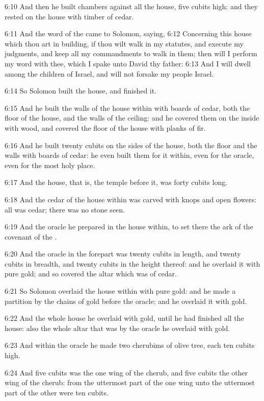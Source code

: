 6:10 And then he built chambers against all the house, five cubits
high: and they rested on the house with timber of cedar.

6:11 And the word of the \LORD came to Solomon, saying, 6:12 Concerning
this house which thou art in building, if thou wilt walk in my
statutes, and execute my judgments, and keep all my commandments to
walk in them; then will I perform my word with thee, which I spake
unto David thy father: 6:13 And I will dwell among the children of
Israel, and will not forsake my people Israel.

6:14 So Solomon built the house, and finished it.

6:15 And he built the walls of the house within with boards of cedar,
both the floor of the house, and the walls of the ceiling: and he
covered them on the inside with wood, and covered the floor of the
house with planks of fir.

6:16 And he built twenty cubits on the sides of the house, both the
floor and the walls with boards of cedar: he even built them for it
within, even for the oracle, even for the most holy place.

6:17 And the house, that is, the temple before it, was forty cubits
long.

6:18 And the cedar of the house within was carved with knops and open
flowers: all was cedar; there was no stone seen.

6:19 And the oracle he prepared in the house within, to set there the
ark of the covenant of the \LORD.

6:20 And the oracle in the forepart was twenty cubits in length, and
twenty cubits in breadth, and twenty cubits in the height thereof: and
he overlaid it with pure gold; and so covered the altar which was of
cedar.

6:21 So Solomon overlaid the house within with pure gold: and he made
a partition by the chains of gold before the oracle; and he overlaid
it with gold.

6:22 And the whole house he overlaid with gold, until he had finished
all the house: also the whole altar that was by the oracle he overlaid
with gold.

6:23 And within the oracle he made two cherubims of olive tree, each
ten cubits high.

6:24 And five cubits was the one wing of the cherub, and five cubits
the other wing of the cherub: from the uttermost part of the one wing
unto the uttermost part of the other were ten cubits.

